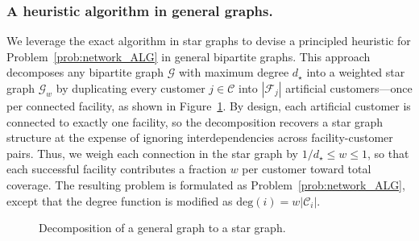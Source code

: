 \documentclass[nonblindrev]{informs3noheader}
\def\calC{\mathcal{C}}
\def\calF{\mathcal{F}}
\def\calG{\mathcal{G}}
\begin{document}
\subsubsection*{A heuristic algorithm in general graphs.}

We leverage the exact algorithm in star graphs to devise a principled heuristic for Problem~\eqref{prob:network_ALG} in general bipartite graphs. This approach decomposes any bipartite graph $\calG$ with maximum degree $d_\star$ into a weighted star graph $\calG_w$ by duplicating every customer $j\in\calC$ into $|\calF_j|$ artificial customers---once per connected facility, as shown in Figure~\ref{fig:graph_decompose}. By design, each artificial customer is connected to exactly one facility, so the decomposition recovers a star graph structure at the expense of ignoring interdependencies across facility-customer pairs. Thus, we weigh each connection in the star graph by $1/d_\star\leq w \leq 1$, so that each successful facility contributes a fraction $w$ per customer toward total coverage. The resulting problem is formulated as Problem~\eqref{prob:network_ALG}, except that the degree function is modified as $\text{deg}(i)=w|\calC_i|$.

\begin{figure}[h!]
\centering
{}
\caption{Decomposition of a general graph to a star graph.}\label{fig:graph_decompose}
\end{figure}
\end{document}
